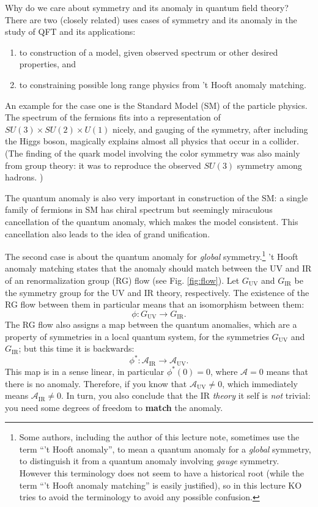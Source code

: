 \documentclass[
]{scrartcl}
\providecommand{\tightlist}{%
  \setlength{\itemsep}{0pt}\setlength{\parskip}{0pt}}
\numberwithin{equation}{section}
\theoremstyle{definition}
\theoremstyle{definition}
\theoremstyle{definition}
\theoremstyle{definition}
\theoremstyle{remark}
\begin{document}
Why do we care about symmetry and its anomaly in quantum field theory?
There are two (closely related) uses cases of symmetry and its anomaly in the study of QFT and its applications:

\begin{enumerate}
\def\labelenumi{\arabic{enumi}.}
\tightlist
\item
  to construction of a model, given observed spectrum or other desired properties, and
\item
  to constraining possible long range physics from 't Hooft anomaly matching.
\end{enumerate}

An example for the case one is the Standard Model (SM) of the particle physics.
The spectrum of the fermions fits into a representation of \(SU(3)\times SU(2) \times U(1)\) nicely, and gauging of the symmetry, after including the Higgs boson, magically explains almost all physics that occur in a collider. (The finding of the quark model involving the color symmetry was also mainly from group theory: it was to reproduce the observed \(SU(3)\) symmetry among hadrons. )

The quantum anomaly is also very important in construction of the SM: a single family of fermions in SM has chiral spectrum but seemingly miraculous cancellation of the quantum anomaly, which makes the model consistent. This cancellation also leads to the idea of grand unification.

The second case is about the quantum anomaly for \emph{global} symmetry.\footnote{Some authors, including the author of this lecture note, sometimes use the term ``'t Hooft anomaly'', to mean a quantum anomaly for a \emph{global} symmetry, to distinguish it from a quantum anomaly involving \emph{gauge} symmetry. However this terminology does not seem to have a historical root (while the term ``'t Hooft anomaly matching'' is easily justified), so in this lecture KO tries to avoid the terminology to avoid any possible confusion.}
't Hooft anomaly matching states that the anomaly should match between the UV and IR of an renormalization group (RG) flow (see Fig. \ref{fig:flow}).
Let \(G_\text{UV}\) and \(G_\text{IR}\) be the symmetry group for the UV and IR theory, respectively.
The existence of the RG flow between them in particular means that an isomorphism between them:
\begin{equation}
  \label{eq:Ghom}
  \phi: G_\text{UV} \to G_\text{IR}.
\end{equation}
The RG flow also assigns a map between the quantum anomalies, which are a property of symmetries in a local quantum system, for the symmetries \(G_\text{UV}\) and \(G_\text{IR}\);
but this time it is backwards:
\begin{equation}
  \label{eq:pullback}
  \phi^*: \mathcal{A}_\text{IR} \to \mathcal{A}_\text{UV}.
\end{equation}
This map is in a sense linear, in particular \(\phi^* (0) = 0\), where \(\mathcal{A}=0\) means that there is no anomaly.
Therefore, if you know that \(\mathcal{A}_\text{UV}\neq 0\), which immediately means \(\mathcal{A}_\text{IR}\neq 0\).
In turn, you also conclude that the IR \emph{theory} it self is \emph{not} trivial: you need some degrees of freedom to \textbf{match} the anomaly.
\end{document}
